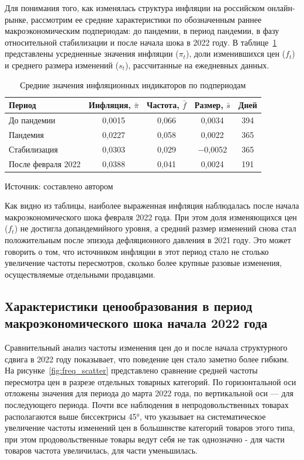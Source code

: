 Для понимания того, как изменялась структура инфляции на российском онлайн-рынке, рассмотрим ее средние характеристики по обозначенным раннее макроэкономическим подпериодам: до пандемии, в период пандемии, в фазу относительной стабилизации и после начала шока в 2022 году. В таблице~\ref{tab:inf_summary} представлены усредненные значения инфляции ($\pi_t$), доли изменившихся цен ($f_t$) и среднего размера изменений ($s_t$), рассчитанные на ежедневных данных.

\begin{table}[h]
	\centering
	\caption{Средние значения инфляционных индикаторов по подпериодам}
	\label{tab:inf_summary}
	\begin{tabular}{lcccc}
		\toprule
		\textbf{Период} & \textbf{Инфляция, $\bar{\pi}$} & \textbf{Частота, $\bar{f}$} & \textbf{Размер, $\bar{s}$} & \textbf{Дней}\\
		\midrule
		До пандемии & 0,0015 & 0,066 & 0,0034 & 394 \\
		Пандемия & 0,0227 & 0,058 & 0,0022 & 365 \\
		Стабилизация & 0,0303 & 0,029 & $-$0,0052 & 365 \\
		После февраля 2022 & 0,0388 & 0,041 & 0,0024 & 191 \\
		\bottomrule
	\end{tabular}
	\vspace{0.5em} %
	\raggedright
	\small{Источник: составлено автором}
\end{table}

Как видно из таблицы, наиболее выраженная инфляция наблюдалась после начала макроэкономического шока февраля 2022 года. При этом доля изменяющихся цен ($f_t$) не достигла допандемийного уровня, а средний размер изменений снова стал положительным после эпизода дефляционного давления в 2021 году. Это может говорить о том, что источником инфляции в этот период стало не столько увеличение частоты пересмотров, сколько более крупные разовые изменения, осуществляемые отдельными продавцами.



\subsection{Характеристики ценообразования в период макроэкономического шока начала 2022 года}\label{subsec:ch3/sec4/shock}

Сравнительный анализ частоты изменения цен до и после начала структурного сдвига в 2022 году показывает, что поведение цен стало заметно более гибким. На рисунке~\ref{fig:freq_scatter} представлено сравнение средней частоты пересмотра цен в разрезе отдельных товарных категорий. По горизонтальной оси отложены значения для периода до марта 2022 года, по вертикальной оси — для последующего периода. Почти все наблюдения в непродовольственных товарах располагаются выше биссектрисы 45°, что указывает на систематическое увеличение частоты изменений цен в большинстве категорий товаров этого типа, при этом продовольственные товары ведут себя не так однозначно - для части товаров частота увеличилась, для части уменьшилась.

